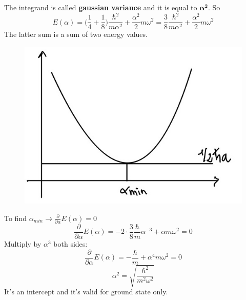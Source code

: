 The integrand is called \textbf{gaussian variance} and it is equal to $\mathbf{\alpha^2}$. So
\[
E(\alpha)=\bigg(\frac{1}{4}+\frac{1}{8}\bigg)\frac{\hbar^2}{m\alpha^2}+\frac{\alpha^2}{2}m\omega^2 = \frac{3}{8}\frac{\hbar^2}{m\alpha^2}+\frac{\alpha^2}{2}m\omega^2
\]
The latter sum is a sum of two energy values.
\begin{figure}[htbp!]
	\centering
	\includegraphics[scale=0.20]{img_4.jpg}
\end{figure}
To find $\alpha_{min}\rightarrow\frac{\partial}{\partial \alpha}E(\alpha)=0$
\[
\frac{\partial}{\partial \alpha}E(\alpha)=-2\cdot\frac{3}{8}\frac{\hbar}{m}\alpha^{-3}+\alpha m\omega^2=0
\]
Multiply by $\alpha^3$ both sides:
\[
\frac{\partial}{\partial \alpha}E(\alpha)=-\frac{\hbar}{m}+\alpha^4m\omega^2=0
\]
\[
\alpha^2=\sqrt{\frac{\hbar^2}{m^2\omega^2}}
\]
It's an intercept and it's valid for ground state only.
